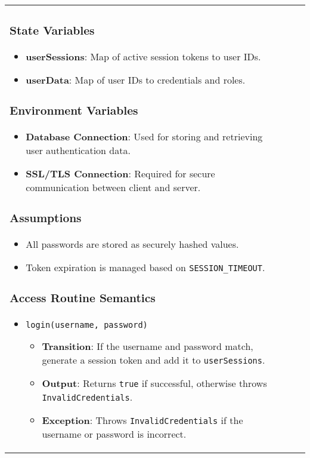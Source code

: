 \documentclass[12pt, titlepage]{article}
\begin{document}
\begin{center}
\begin{tabular}{|p{3cm}|p{4cm}|p{4cm}|p{4cm}|}
\begin{itemize}
\subsubsection{State Variables}

\begin{itemize}
    \item \textbf{userSessions}: Map of active session tokens to user IDs.
    \item \textbf{userData}: Map of user IDs to credentials and roles.
\end{itemize}

\subsubsection{Environment Variables}

\begin{itemize}
    \item \textbf{Database Connection}: Used for storing and retrieving user authentication data.
    \item \textbf{SSL/TLS Connection}: Required for secure communication between client and server.
\end{itemize}

\subsubsection{Assumptions}

\begin{itemize}
    \item All passwords are stored as securely hashed values.
    \item Token expiration is managed based on \texttt{SESSION\_TIMEOUT}.
\end{itemize}

\subsubsection{Access Routine Semantics}

\begin{itemize}
    \item \texttt{login(username, password)}
    \begin{itemize}
        \item \textbf{Transition}: If the username and password match, generate a session token and add it to \texttt{userSessions}.
        \item \textbf{Output}: Returns \texttt{true} if successful, otherwise throws \texttt{InvalidCredentials}.
        \item \textbf{Exception}: Throws \texttt{InvalidCredentials} if the username or password is incorrect.
    \end{itemize}


\end{itemize}
\end{itemize}
\end{tabular}
\end{center}
\end{document}
